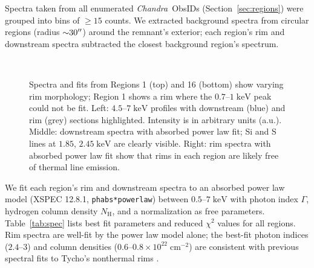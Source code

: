 \documentclass[iop, apj, numberedappendix]{emulateapj}
\newcommand*{\mt}{\mathrm}
\newcommand*{\unit}[1]{\;\mt{#1}}  %
\newcommand*{\abt}{\mathord{\sim}} %
\newcommand*{\Chandra}{\textit{Chandra}\ }
\begin{document}
Spectra taken from all enumerated \Chandra ObsIDs (Section~\ref{sec:regions})
were grouped into bins of $\geq 15$ counts.  We extracted background spectra
from circular regions (radius $\abt 30\arcsec$) around the remnant's exterior;
each region's rim and downstream spectra subtracted the closest background
region's spectrum.

\begin{figure*}
    \iftoggle{manuscript}{
        \epsscale{0.7}
    }{}
     \\
    \caption{Spectra and fits from Regions 1 (top) and 16 (bottom) show varying
        rim morphology; Region 1 shows a rim where the $0.7$--$1 \unit{keV}$
        peak could not be fit.  Left: $4.5$--$7 \unit{keV}$ profiles with
        downstream (blue) and rim (grey) sections highlighted.  Intensity is in
        arbitrary units (a.u.).  Middle: downstream spectra with absorbed
        power law fit; Si and S lines at $1.85$, $2.45 \unit{keV}$ are clearly
        visible.  Right: rim spectra with absorbed power law fit show that
        rims in each region are likely free of thermal line emission.}
    \label{fig:spec}
\end{figure*}

We fit each region's rim and downstream spectra to an absorbed power law model
(XSPEC 12.8.1, \texttt{phabs*powerlaw}) between $0.5$--$7 \unit{keV}$ with
photon index $\Gamma$, hydrogen column density $N_{\mt{H}}$, and a
normalization as free parameters.  Table~\ref{tab:spec} lists best fit
parameters and reduced $\chi^2$ values for all regions.  Rim spectra are
well-fit by the power law model alone; the best-fit photon indices ($2.4$--$3$)
and column densities ($0.6$--$0.8 \times 10^{22} \unit{cm^{-2}}$) are
consistent with previous spectral fits to Tycho's nonthermal rims
\citep{hwang2002, cassam-chenai2007}.
\end{document}
